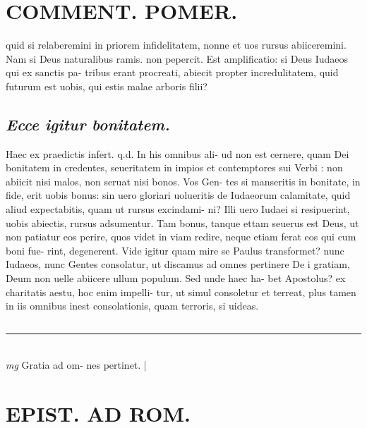 \documentclass{article}
\begin{document}
\begin{pages}
\section*{COMMENT. POMER.  }\pstart quid si relaberemini in priorem infidelitatem, nonne et uos rursus abiiceremini.  \pend\pstart Nam si Deus naturalibus ramis. non pepercit.  \pend\pstart Est amplificatio: si Deus Iudaeos qui ex sanctis pa- tribus erant procreati, abiecit propter incredulitatem, quid futurum est uobis, qui estis malae arboris filii?  \pend
{}
{}
\subsection*{\textit{Ecce igitur bonitatem. }}\pstart Haec ex praedictis infert. q.d. In his omnibus ali- ud non est cernere, quam Dei bonitatem in credentes, seueritatem in impios et contemptores sui Verbi : non abiicit nisi malos, non seruat nisi bonos. Vos Gen- tes si manseritis in bonitate, in fide, erit uobis bonus: sin uero gloriari uolueritis de Iudaeorum calamitate, quid aliud expectabitis, quam ut rursus excindami- ni? Illi uero Iudaei si resipuerint, uobis abiectis, rursus adsumentur. Tam bonus, tanque ettam seuerus est Deus, ut non patiatur eos perire, quos videt in viam redire, neque etiam ferat eos qui cum boni fue- rint, degenerent. Vide igitur quam mire se Paulus transformet? nunc Iudaeos, nunc Gentes consolatur, ut discamus ad omnes pertinere De i gratiam, Deum non uelle abiicere ullum populum. Sed unde haec ha- bet Apostolus? ex charitatis aestu, hoc enim impelli- tur, ut simul consoletur et terreat, plus tamen in iis omnibus inest consolationis, quam terroris, si uideas.   \pend
{}
{}
\subsection*{\textit{}}
\vspace{0.5cm}\noindent
\vspace{0.2cm}\rule{1cm}{0.2pt}\\ 
\hspace{0.2cm}\textit{mg}
\footnotesize Gratia ad om- nes pertinet.  
\normalsize| 
\section*{EPIST. AD ROM.  }
\marginpar{[ p. ]}
{}

\end{pages}
\end{document}
